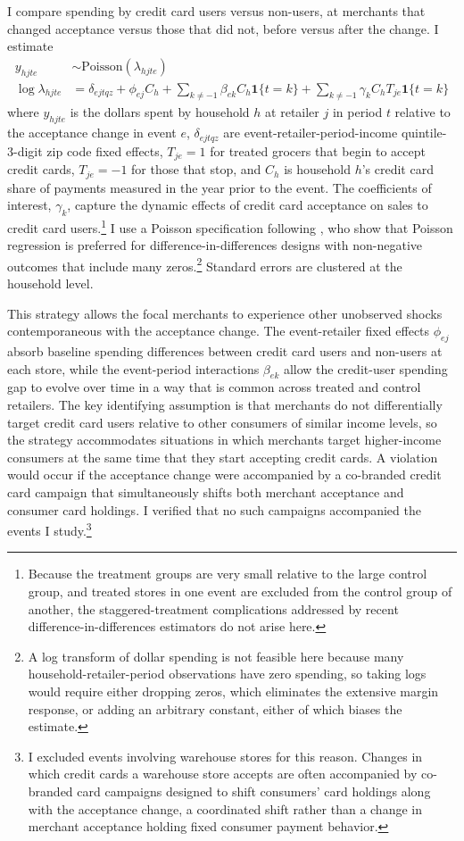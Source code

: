 \documentclass[main.tex]{subfiles}
\begin{document}
I compare spending by credit card users versus non-users, at merchants that changed acceptance versus those that did not, before versus after the change.
I estimate
\begin{align}
y_{hjte} &\sim \text{Poisson}(\lambda_{hjte}) \\
\log \lambda_{hjte} &= \delta_{ejtqz} + \phi_{ej} C_h + \sum_{k \neq -1} \beta_{ek} C_h \mathbf{1}\{t=k\} + \sum_{k \neq -1} \gamma_k C_h T_{je} \mathbf{1}\{t=k\}
\end{align}
where $y_{hjte}$ is the dollars spent by household $h$ at retailer $j$ in period $t$ relative to the acceptance change in event $e$, $\delta_{ejtqz}$ are event-retailer-period-income quintile-3-digit zip code fixed effects, $T_{je} = 1$ for treated grocers that begin to accept credit cards, $T_{je} = -1$ for those that stop, and $C_h$ is household $h$'s credit card share of payments measured in the year prior to the event.
The coefficients of interest, $\gamma_k$, capture the dynamic effects of credit card acceptance on sales to credit card users.\footnote{Because the treatment groups are very small relative to the large control group, and treated stores in one event are excluded from the control group of another, the staggered-treatment complications addressed by recent difference-in-differences estimators do not arise here.}
I use a Poisson specification following \textcite{Cohn.etal2022}, who show that Poisson regression is preferred for difference-in-differences designs with non-negative outcomes that include many zeros.\footnote{A log transform of dollar spending is not feasible here because many household-retailer-period observations have zero spending, so taking logs would require either dropping zeros, which eliminates the extensive margin response, or adding an arbitrary constant, either of which biases the estimate.}
Standard errors are clustered at the household level.

This strategy allows the focal merchants to experience other unobserved shocks contemporaneous with the acceptance change.
The event-retailer fixed effects $\phi_{ej}$ absorb baseline spending differences between credit card users and non-users at each store, while the event-period interactions $\beta_{ek}$ allow the credit-user spending gap to evolve over time in a way that is common across treated and control retailers.
The key identifying assumption is that merchants do not differentially target credit card users relative to other consumers of similar income levels, so the strategy accommodates situations in which merchants target higher-income consumers at the same time that they start accepting credit cards.
A violation would occur if the acceptance change were accompanied by a co-branded credit card campaign that simultaneously shifts both merchant acceptance and consumer card holdings.
I verified that no such campaigns accompanied the events I study.\footnote{I excluded events involving warehouse stores for this reason.
Changes in which credit cards a warehouse store accepts are often accompanied by co-branded card campaigns designed to shift consumers' card holdings along with the acceptance change, a coordinated shift rather than a change in merchant acceptance holding fixed consumer payment behavior.}
\end{document}
